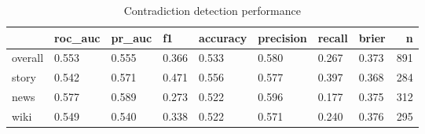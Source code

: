 \begin{table}
\caption{Contradiction detection performance}
\label{tab:results}
\begin{tabular}{llllllllr}
\toprule
 & roc_auc & pr_auc & f1 & accuracy & precision & recall & brier & n \\
\midrule
overall & 0.553 & 0.555 & 0.366 & 0.533 & 0.580 & 0.267 & 0.373 & 891 \\
story & 0.542 & 0.571 & 0.471 & 0.556 & 0.577 & 0.397 & 0.368 & 284 \\
news & 0.577 & 0.589 & 0.273 & 0.522 & 0.596 & 0.177 & 0.375 & 312 \\
wiki & 0.549 & 0.540 & 0.338 & 0.522 & 0.571 & 0.240 & 0.376 & 295 \\
\bottomrule
\end{tabular}
\end{table}
